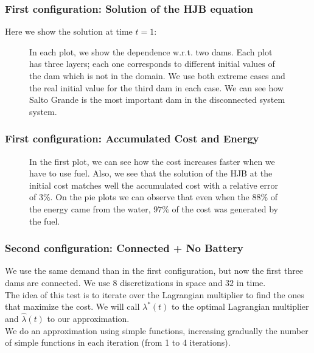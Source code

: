 \documentclass[aspectratio=169]{beamer}\usepackage[utf8]{inputenc}
\begin{document}
\begin{frame}\frametitle{First configuration: Solution of the HJB equation}
Here we show the solution at time $t=1$:
\begin{figure}[ht!]
\centering
{}
\caption{In each plot, we show the dependence w.r.t. two dams. Each plot has three layers; each one corresponds to different initial values of the dam which is not in the domain. We use both extreme cases and the real initial value for the third dam in each case. We can see how Salto Grande is the most important dam in the disconnected system system.}
\end{figure}
\end{frame}

\begin{frame}\frametitle{First configuration: Accumulated Cost and Energy}
\begin{figure}[ht!]
\centering
{}
\caption{In the first plot, we can see how the cost increases faster when we have to use fuel. Also, we see that the solution of the HJB at the initial cost matches well the accumulated cost with a relative error of 3\%. On the pie plots we can observe that even when the $88\%$ of the energy came from the water, $97\%$ of the cost was generated by the fuel.}
\end{figure}
\end{frame}

\begin{frame}\frametitle{Second configuration: Connected + No Battery}
We use the same demand than in the first configuration, but now the first three dams are connected. We use $8$ discretizations in space and $32$ in time.\\
The idea of this test is to iterate over the Lagrangian multiplier to find the ones that maximize the cost. We will call $\lambda^*(t)$ to the optimal Lagrangian multiplier and $\hat{\lambda}(t)$ to our approximation.\\
We do an approximation using simple functions, increasing gradually the number of simple functions in each iteration (from 1 to 4 iterations).
\begin{figure}[ht!]
\centering
{}
\end{figure}
\end{frame}
\end{document}
